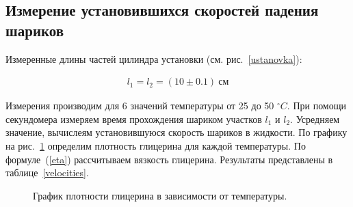 \documentclass[a4paper, 12pt]{article}
\begin{document}
    \subsection{Измерение установившихся скоростей падения шариков}

    Измеренные длины частей цилиндра установки (см. рис.~\ref{ustanovka}):

    \begin{align*}
        l_1 = l_2 = (10 \pm 0.1)~см
    \end{align*}

    Измерения производим для 6 значений температуры от 25 до 50 $ ^\circ C $. При помощи секундомера измеряем время прохождения шариком участков $l_1$ и $l_2$. Усредняем значение, вычислеям установившуюся скорость шариков в жидкости. По графику на рис.~\ref{density} определим плотность глицерина для каждой температуры. По формуле~(\ref{eta}) рассчитываем вязкость глицерина. Результаты представлены в таблице~\ref{velocities}.

    \begin{figure}[ht]
        \caption{График плотности глицерина в зависимости от температуры.}
        \label{density}
    \end{figure}
\end{document}
